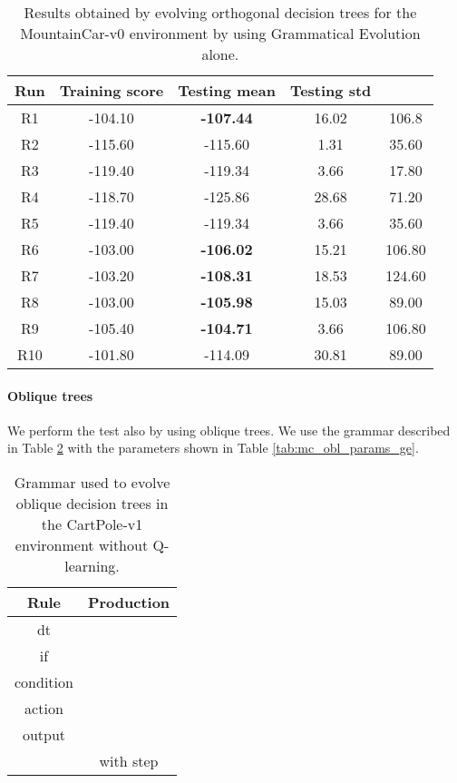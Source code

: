 \documentclass[review,english]{elsarticle}
\begin{document}
\begin{table}[ht]
    \centering
    \begin{tabular}{|c|c|c|c|c|} \hline
        \textbf{Run} & \textbf{Training score} & \textbf{Testing mean} & \textbf{Testing std} & \textbf{} \\ \hline
        R1 & -104.10 & \textbf{-107.44} & 16.02 & 106.8 \\ R2 & -115.60 & -115.60 & 1.31 & 35.60 \\ R3 & -119.40 & -119.34 & 3.66 & 17.80 \\ R4 & -118.70 & -125.86 & 28.68 & 71.20 \\ R5 & -119.40 & -119.34 & 3.66 & 35.60 \\ R6 & -103.00 & \textbf{-106.02} & 15.21 & 106.80 \\ R7 & -103.20 & \textbf{-108.31} & 18.53 & 124.60 \\ R8 & -103.00 & \textbf{-105.98} & 15.03 & 89.00 \\ R9 & -105.40 & \textbf{-104.71} & 3.66 & 106.80 \\ R10 & -101.80 & -114.09 & 30.81 & 89.00 \\ \hline 
    \end{tabular}
    \caption{Results obtained by evolving orthogonal decision trees for the MountainCar-v0 environment by using Grammatical Evolution alone.}
    \label{tab:mc_abl_ort_results}
\end{table}

\paragraph{Oblique trees}
We perform the test also by using oblique trees.
We use the grammar described in Table \ref{tab:mc_abl_obl_grammar} with the parameters shown in Table \ref{tab:mc_obl_params_ge}.

\begin{table}
    \centering
    \begin{tabular}{|c|c|} \hline
        \textbf{Rule} & \textbf{Production} \\ \hline
        dt &  \\ if &  \\ condition &  \\ action &  \\ output &  \\  &  with step  \\ \hline
    \end{tabular}
    \caption{Grammar used to evolve oblique decision trees in the CartPole-v1 environment without Q-learning.}
    \label{tab:mc_abl_obl_grammar}
\end{table}
\end{document}
